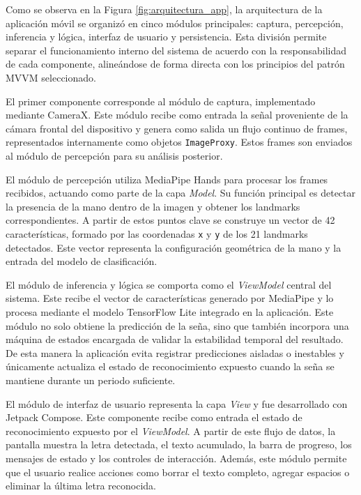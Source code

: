 	Como se observa en la Figura \ref{fig:arquitectura_app}, la arquitectura de la aplicación móvil se organizó en cinco módulos principales: captura, percepción, inferencia y lógica, interfaz de usuario y persistencia. Esta división permite separar el funcionamiento interno del sistema de acuerdo con la responsabilidad de cada componente, alineándose de forma directa con los principios del patrón MVVM seleccionado.
	
	El primer componente corresponde al módulo de captura, implementado mediante CameraX. Este módulo recibe como entrada la señal proveniente de la cámara frontal del dispositivo y genera como salida un flujo continuo de frames, representados internamente como objetos \texttt{ImageProxy}. Estos frames son enviados al módulo de percepción para su análisis posterior.
	
	El módulo de percepción utiliza MediaPipe Hands para procesar los frames recibidos, actuando como parte de la capa \textit{Model}. Su función principal es detectar la presencia de la mano dentro de la imagen y obtener los landmarks correspondientes. A partir de estos puntos clave se construye un vector de 42 características, formado por las coordenadas \texttt{x} y \texttt{y} de los 21 landmarks detectados. Este vector representa la configuración geométrica de la mano y   la entrada del modelo de clasificación.
	
	El módulo de inferencia y lógica se comporta como el \textit{ViewModel} central del sistema. Este recibe el vector de características generado por MediaPipe y lo procesa mediante el modelo TensorFlow Lite integrado en la aplicación. Este módulo no solo obtiene la predicción de la seña, sino que también incorpora una máquina de estados encargada de validar la estabilidad temporal del resultado. De esta manera la aplicación evita registrar predicciones aisladas o inestables y únicamente actualiza el estado de reconocimiento expuesto cuando la seña se mantiene durante un periodo suficiente.
	
	El módulo de interfaz de usuario representa la capa \textit{View} y fue desarrollado con Jetpack Compose. Este componente recibe como entrada el estado de reconocimiento expuesto por el \textit{ViewModel}. A partir de este flujo de datos, la pantalla muestra la letra detectada, el texto acumulado, la barra de progreso, los mensajes de estado y los controles de interacción. Además, este módulo permite que el usuario realice acciones como borrar el texto completo, agregar espacios o eliminar la última letra reconocida.
	
